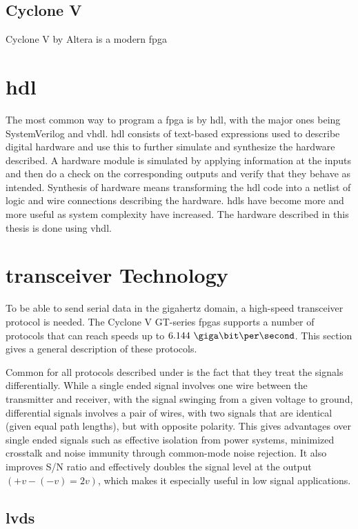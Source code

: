 \documentclass[main.tex]{subfiles}
\begin{document}
\subsection{Cyclone V} \label{sec:cyclone}
Cyclone V by Altera is a modern \gls{fpga} 

\section{\gls{hdl}}
The most common way to program a \gls{fpga} is by \gls{hdl}, with the major ones being SystemVerilog and \acrshort{vhdl}. \Gls{hdl} consists of text-based expressions used to describe digital hardware and use this to further simulate and synthesize the hardware described. A hardware module is simulated by applying information at the inputs and then do a check on the corresponding outputs and verify that they behave as intended. Synthesis of hardware means transforming the \gls{hdl} code into a netlist of logic and wire connections describing the hardware. \glspl{hdl} have become more and more useful as system complexity have increased. \cite{weste11} The hardware described in this thesis is done using \acrshort{vhdl}. 


\section{\Gls{transceiver} Technology}

To be able to send serial data in the gigahertz domain, a high-speed transceiver protocol is needed. The Cyclone V GT-series \glspl{fpga} supports a number of protocols that can reach speeds up to $6.144\ \giga\bit\per\second$. This section gives a general description of these protocols.

Common for all protocols described under is the fact that they treat the signals differentially. While a single ended signal involves one wire between the transmitter and receiver, with the signal swinging from a given voltage to ground, differential signals involves a pair of wires, with two signals that are identical (given equal path lengths), but with opposite polarity. This gives advantages over single ended signals such as effective isolation from power systems, minimized crosstalk and noise immunity through common-mode noise rejection. It also improves S/N ratio and effectively doubles the signal level at the output $(+v - (-v) = 2v)$, which makes it especially useful in low signal applications.\cite{douglas01}

\subsection{\gls{lvds}}
\end{document}
